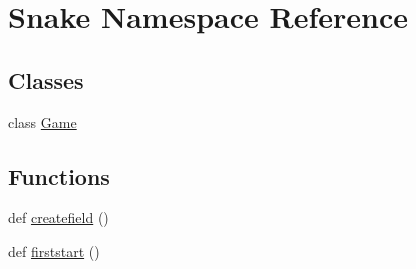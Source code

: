 \hypertarget{namespace_snake}{}\section{Snake Namespace Reference}
\label{namespace_snake}
\subsection*{Classes}
\begin{DoxyCompactItemize}
\item 
class \mbox{\hyperlink{class_snake_1_1_game}{Game}}
\end{DoxyCompactItemize}
\subsection*{Functions}
\begin{DoxyCompactItemize}
\item 
def \mbox{\hyperlink{namespace_snake_a91223592dfcc9c233f9d7c5b16809456}{createfield}} ()
\item 
def \mbox{\hyperlink{namespace_snake_a8f6d4da01109c97d36f9a18d5a0bb0b3}{firststart}} ()
\end{DoxyCompactItemize}
